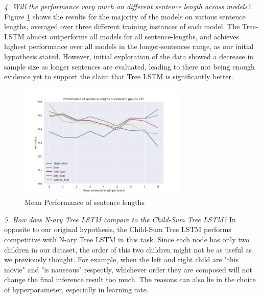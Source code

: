     \textit{4. Will the performance vary much on different sentence length across models?} 
    Figure \ref{fig: results-sent-leng} shows the results for the majority of
    the models on various sentence lengths, averaged over three different
    training instances of each model. The Tree-LSTM almost outperforms all
    models for all sentence-lengths, and achieves highest performance over all
    models in the longer-sentences range, as our initial hypothesis stated.
    However, initial exploration of the data showed a decrease in sample size as
    longer sentences are evaluated, leading to there not being enough evidence
    yet to support the claim that Tree LSTM is significantly better.
    
    \begin{figure}
        \includegraphics[width=80mm]{assets/Sen_length.png}
        \caption{Mean Performance of sentence lengths }
        \label{fig: results-sent-leng}
    \end{figure}

    \textit{5. How does N-ary Tree LSTM compare to the Child-Sum Tree LSTM?}
    In opposite to our original hypothesis, the Child-Sum Tree LSTM performs
    competitive with N-ary Tree LSTM in this task. Since each node has only two
    children in our dataset, the order of this two children might not be as
    useful as we previously thought. For example, when the left and right child
    are "this movie" and "is nauseous" respectly, whichever order they are
    composed will not change the final inference result too much. The reasons
    can also lie in the choice of hyperparameter, especially in learning rate. 
